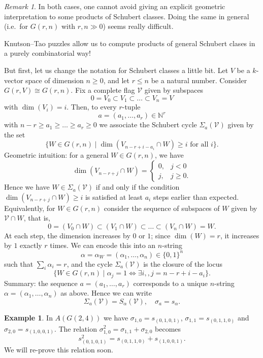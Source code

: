 \documentclass[12pt,a4paper]{amsart}
\theoremstyle{plain}
\theoremstyle{definition}
\newtheorem{exmp}[thm]{Example}
\theoremstyle{remark}
\newtheorem{rem}[thm]{Remark}
\begin{document}
\begin{rem}
  In both cases, one cannot avoid giving an explicit geometric interpretation to some products of Schubert classes.
  Doing the same in general (i.e.~for $G(r,n)$ with $r,n \gg 0$) seems really difficult.
\end{rem}

Knutson--Tao puzzles allow us to compute products of general Schubert clases in a purely combinatorial way!

But first, let us change the notation for Schubert classes a little bit.
Let $V$ be a $k$-vector space of dimension $n \geq 0$, and let $r \leq n$ be a natural number.
Consider $G(r,V) \cong G(r,n)$.
Fix a complete flag $\mathcal{V}$ given by subspaces
\[ 0 = V_{0} \subset V_{1} \subset \ldots \subset V_{n} = V \]
with $\dim(V_{i}) = i$.
Then, to every $r$-tuple
\[ a = (a_{1}, \ldots, a_{r}) \in \mathbb{N}^{r} \]
with $n - r \geq a_{1} \geq \ldots \geq a_{r} \geq 0$ we associate the Schubert cycle $\Sigma_{a}(\mathcal{V})$ given by the set
\[ \{ W \in G(r,n) \mid \dim(V_{n-r+i-a_{i}} \cap W) \geq i \text{ for all }i \}. \]
Geometric intuition: for a general $W \in G(r,n)$, we have
\[ \dim(V_{n-r+j} \cap W) = \begin{cases}
  0, & j < 0 \\
  j, & j\geq 0.
\end{cases} \]
Hence we have $W \in \Sigma_{a}(\mathcal{V})$ if and only if the condition $\dim(V_{n-r+j} \cap W) \geq i$ is satisfied at least $a_{i}$ steps earlier than expected.
Equivalently, for $W \in G(r,n)$ consider the sequence of subspaces of $W$ given by $\mathcal{V} \cap W$, that is,
\[ 0 = (V_{0} \cap W) \subset (V_{1} \cap W) \subset \ldots \subset (V_{n} \cap W) = W. \]
At each step, the dimension increases by $0$ or $1$; since $\dim(W) = r$, it increases by $1$ exactly $r$ times.
We can encode this into an $n$-string
\[ \alpha = \alpha_{W} = (\alpha_{1}, \ldots, \alpha_{n}) \in \{ 0, 1\}^{n} \]
such that $\sum_{i} \alpha_{i} = r$, and the cycle $\Sigma_{a}(\mathcal{V})$ is the closure of the locus
\[ \{ W \in G(r,n) \mid \alpha_{j} = 1 \Leftrightarrow \exists i,, j = n - r + i - a_{i} \}. \]
Summary: the sequence $a = (a_{1}, \ldots, a_{r})$ corresponds to a unique $n$-string $\alpha = (\alpha_{1}, \ldots, \alpha_{n})$ as above.
Hence we can write
\[ \Sigma_{a}(\mathcal{V}) = S_{\alpha}(\mathcal{V}), \quad \sigma_{a} = s_{\alpha}. \]

\begin{exmp}
  In $A(G(2,4))$ we have $\sigma_{1,0} = s_{(0,1,0,1)}$, $\sigma_{1,1} = s_{(0,1,1,0)}$ and $\sigma_{2,0} = s_{(1,0,0,1)}$.
  The relation $\sigma_{1,0}^{2} = \sigma_{1,1} + \sigma_{2,0}$ becomes
  \[ s_{(0,1,0,1)}^{2} = s_{(0,1,1,0)} + s_{(1,0,0,1)}. \]
  We will re-prove this relation soon.
\end{exmp}
\end{document}
